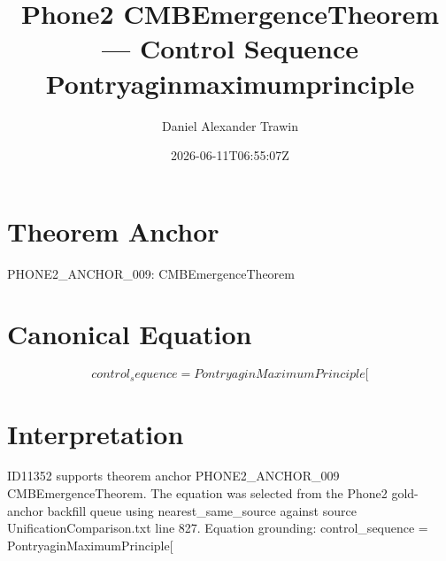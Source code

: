 \documentclass[11pt]{article}
\title{Phone2 CMBEmergenceTheorem — Control Sequence Pontryaginmaximumprinciple}
\author{Daniel Alexander Trawin}
\date{2026-06-11T06:55:07Z}
\begin{document}
\maketitle
\section*{Theorem Anchor}
PHONE2_ANCHOR_009: CMBEmergenceTheorem
\section*{Canonical Equation}
\[
control_sequence = PontryaginMaximumPrinciple[
\]
\section*{Interpretation}
ID11352 supports theorem anchor PHONE2_ANCHOR_009 CMBEmergenceTheorem. The equation was selected from the Phone2 gold-anchor backfill queue using nearest_same_source against source UnificationComparison.txt line 827. Equation grounding: control_sequence = PontryaginMaximumPrinciple[
\end{document}
